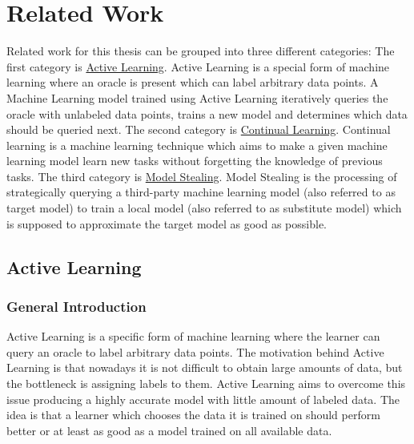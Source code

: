 
\chapter{Related Work}
\label{ch:Related_work}
Related work for this thesis can be grouped into three different categories:
The first category is \href{sec:Related_work:Active_Learning}{Active Learning}.
Active Learning is a special form of machine learning where an oracle is present
which can label arbitrary data points. A Machine Learning model trained using Active
Learning iteratively queries the oracle with unlabeled data points, trains a new model
and determines which data should be queried next. The second category is
\href{sec:Related_work:Continual_Learning}{Continual Learning}. Continual learning is a
machine learning technique which aims to make a given machine learning model learn new tasks
without forgetting the knowledge of previous tasks. 
The third category is \href{sec:Related_work:Model_Stealing}{Model Stealing}. Model Stealing is the
processing of strategically querying a third-party machine learning model (also referred to as target model)
to train a local model (also referred to as substitute model) which is supposed to approximate the target model as
good as possible.

\section{Active Learning}
\label{sec:Related_work:Active_Learning}
\subsection{General Introduction}
Active Learning is a specific form of machine learning where the learner can query an oracle to label arbitrary data points.
The motivation behind Active Learning is that nowadays it is not difficult to obtain large amounts of data, but the bottleneck
is assigning labels to them. Active Learning aims to overcome this issue producing a highly accurate model with little amount
 of labeled data. The idea is that a learner which chooses the data it is trained on should perform better or at least as good
 as a model trained on all available data.
